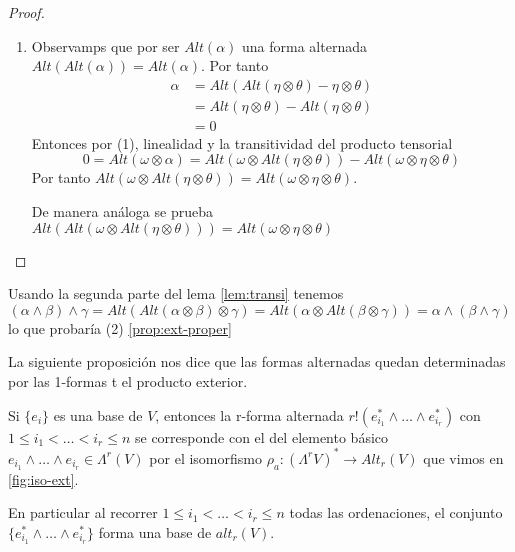 \documentclass[../VD.tex]{subfiles}
\begin{document}
\begin{proof}
\begin{enumerate}
\begin{align*}
(\ref{proof:lem-transi} )&=Signo(\sigma_1)\sum_{\sigma\in G}Signo(\sigma)\alpha(w_{\sigma(1)}\ldots w_{\sigma(r)})\beta(w_{\sigma(r+1)}\ldots w_{\sigma(r+s)})\\
&=Signo(\sigma_1)(r!Alt(\alpha)(w_1\ldots w_r))\beta(w_{r+1}\ldots w_{r+s})\\
&=0
\end{align*}
Si tomamos \( \sigma_2\notin G\cup G\sigma_1 \), tenemos \( G\cap G\sigma_2=\emptyset \) y \( G\sigma_1\cap G\sigma_2=\emptyset \).\\
Repitiendo el proceso anterior llegamos a \( \sum_{\sigma_2}=0 \).

Por la finitud de \( G_{r+s} \) se llegará a cubrir \( G_{r+s} \) con conjuntos disjuntos de la forma \( G, G_{\sigma_1},\ldots,G_{\sigma_k} \) y cada uno de ellos no aporta nada a la suma total, que será por tanto nula.
\item Observamps que por ser \( Alt(\alpha) \) una forma alternada \( Alt(Alt(\alpha))=Alt(\alpha) \). Por tanto
\begin{align*}
\alpha&=Alt(Alt(\eta\otimes\theta)-\eta\otimes\theta)\\
&=Alt(\eta\otimes\theta)-Alt(\eta\otimes\theta)\\
&=0
\end{align*}
Entonces por (1), linealidad y la transitividad del producto tensorial
\[
0=Alt(\omega\otimes\alpha)=Alt(\omega\otimes Alt(\eta\otimes\theta))-Alt(\omega\otimes\eta\otimes\theta)
\]
Por tanto \( Alt(\omega\otimes Alt(\eta\otimes\theta))=Alt(\omega\otimes\eta\otimes\theta) \).

De manera análoga se prueba \( Alt(Alt(\omega\otimes Alt(\eta\otimes\theta)))=Alt(\omega\otimes\eta\otimes\theta) \)
\end{enumerate}
\end{proof}

\begin{note}
Usando la segunda parte del lema \ref{lem:transi} tenemos
\[
(\alpha\wedge\beta)\wedge\gamma=Alt(Alt(\alpha\otimes\beta)\otimes\gamma)=
Alt(\alpha\otimes Alt(\beta\otimes\gamma))=\alpha\wedge(\beta\wedge\gamma)
\]
lo que probaría (2) \ref{prop:ext-proper}
\end{note}

La siguiente proposición nos dice que las formas alternadas quedan determinadas por las 1-formas t el producto exterior.

\begin{proposition}
Si \( \{e_i\} \) es una base de \( V \), entonces la r-forma alternada \( r!(e_{i_1}^*\wedge\ldots\wedge e_{i_r}^*) \) con \( 1\leq i_1< \ldots<i_r\leq n  \) se corresponde con el del elemento básico \( e_{i_1}\wedge\ldots \wedge e_{i_r}\in \Lambda^r(V) \)  por el isomorfismo \( \rho_a\colon(\Lambda^rV)^*\to Alt_r(V)  \) que vimos en \ref{fig:iso-ext}.

En particular al recorrer  \( 1\leq i_1< \ldots<i_r\leq n  \) todas las ordenaciones, el conjunto \( \{e_{i_1}^*\wedge\ldots\wedge e_{i_r}^*\}\) forma una base de \( alt_r(V) \).
\end{proposition}
\end{document}
